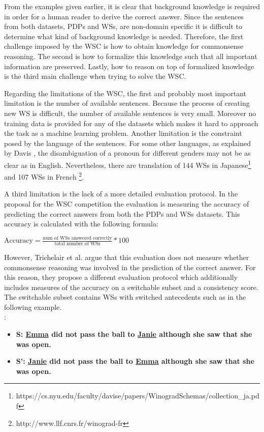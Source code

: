 From the examples given earlier, it is clear that background knowledge is required in order for a human reader to derive the correct answer. Since the sentences from both datasets, PDPs and WSs, are non-domain specific it is difficult to determine what kind of background knowledge is needed. Therefore, the first challenge imposed by the WSC is how to obtain knowledge for commonsense reasoning. 
The second is how to formalize this knowledge such that all important information are preserved. Lastly, how to reason on top of formalized knowledge is the third main challenge when trying to solve the WSC. 

Regarding the limitations of the WSC, the first and probably most important limitation is the number of available sentences. Because the process of creating new WS is difficult, the number of available sentences is very small. Moreover no training data is provided for any of the datasets which makes it hard to approach the task as a machine learning problem. Another limitation is the constraint posed by the language of the sentences. For some other languages, as explained by Davis \cite{DBLP:journals/corr/Davis16}, the disambiguation of a pronoun for different genders may not be as clear as in English. Nevertheless, there are translation of 144 WSs in Japanese\footnote{https://cs.nyu.edu/faculty/davise/papers/WinogradSchemas/collection\_ja.pdf} and 107 WSs in French \footnote{http://www.llf.cnrs.fr/winograd-fr}. 

A third limitation is the lack of a more detailed evaluation protocol. In the proposal for the WSC competition the evaluation is measuring the accuracy of predicting the correct answers from both the PDPs and WSs datasets. This accuracy is calculated with the following formula: \\
\begin{center}
\begin{math}
	\text{Accuracy} = \frac{\text{num of WSs answered correctly}}{\text{total number of WSs}} * 100
\end{math}
\end{center}
However, Trichelair et al. \cite{DBLP:journals/corr/abs-1811-01778} argue that this evaluation does not measure whether commonsense reasoning was involved in the prediction of the correct answer. For this reason, they propose a different evaluation protocol which additionally includes measures of the accuracy on a switchable subset and a consistency score. The switchable subset contains WSs with switched antecedents such as in the following example. \\
:
\begin{itemize} 
	\item \textbf{S: \underline{Emma} did not pass the ball to \underline{Janie} although she saw that she was open.}
	\item \textbf{S': \underline{Janie} did not pass the ball to \underline{Emma} although she saw that she was open.} 
\end{itemize}

